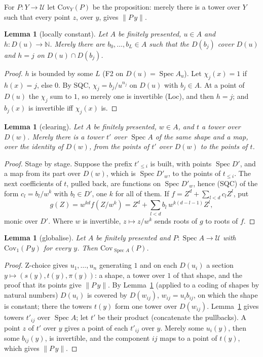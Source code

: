 \documentclass[11pt]{amsart}
\newtheorem{lemma}[theorem]{Lemma}
\theoremstyle{definition}
\theoremstyle{remark}
\newcommand{\Spec}{\operatorname{Spec}}
\newcommand{\tr}[1]{\|#1\|}
\newcommand{\N}{\mathbb N}
\newcommand{\U}{\mathcal U}
\begin{document}
For $P:Y\to\U$ let $\mathrm{Cov}_Y(P)$ be the proposition: merely there is
a tower over $Y$ such that every point $z$, over $y$, gives $\tr{P\,y}$.

\begin{lemma}[locally constant]\label{l:lc}
Let $A$ be finitely presented, $u\in A$ and $h:D(u)\to\N$. Merely there are
$b_0,\dots,b_L\in A$ such that the $D(b_j)$ cover $D(u)$ and $h=j$ on
$D(u)\cap D(b_j)$.
\end{lemma}
\begin{proof}
$h$ is bounded by some $L$ (F2 on $D(u)=\Spec A_u$). Let
$\chi_j(x)=1$ if $h(x)=j$, else $0$. By SQC, $\chi_j=b_j/u^{n_j}$ on
$D(u)$ with $b_j\in A$. At a point of $D(u)$ the $\chi_j$ sum to $1$, so
merely one is invertible (Loc), and then $h=j$; and $b_j(x)$ is
invertible iff $\chi_j(x)$ is.
\end{proof}

\begin{lemma}[clearing]\label{l:clear}
Let $A$ be finitely presented, $w\in A$, and $t$ a tower over $D(w)$.
Merely there is a tower $t'$ over $\Spec A$ of the same shape and a map,
over the identity of $D(w)$, from the points of $t'$ over $D(w)$ to the
points of $t$.
\end{lemma}
\begin{proof}
Stage by stage. Suppose the prefix $t'_{\le i}$ is built, with points
$\Spec D'$, and a map from its part over $D(w)$, which is $\Spec D'_w$, to
the points of $t_{\le i}$. The next coefficients of $t$, pulled back, are
functions on $\Spec D'_w$, hence (SQC) of the form $c_l=b_l/w^k$ with
$b_l\in D'$, one $k$ for all of them. If $f=Z^d+\sum_{l<d}c_lZ^l$, put
\[g(Z)=w^{kd}f(Z/w^k)=Z^d+\sum_{l<d}b_l\,w^{k(d-l-1)}Z^l,\]
monic over $D'$. Where $w$ is invertible, $z\mapsto z/w^k$ sends roots of
$g$ to roots of $f$.
\end{proof}

\begin{lemma}[globalise]\label{l:glob}
Let $A$ be finitely presented and $P:\Spec A\to\U$ with
$\mathrm{Cov}_1(P\,y)$ for every $y$. Then $\mathrm{Cov}_{\Spec A}(P)$.
\end{lemma}
\begin{proof}
Z-choice gives $u_1,\dots,u_n$ generating $1$ and on each $D(u_i)$ a
section $y\mapsto(s(y),t(y),\pi(y))$: a shape, a tower over $1$ of that
shape, and the proof that its points give $\tr{P\,y}$. By
Lemma~\ref{l:lc} (applied to a coding of shapes by natural numbers) $D(u_i)$
is covered by $D(w_{ij})$, $w_{ij}=u_ib_{ij}$, on which the shape is
constant; there the towers $t(y)$ form one tower over $D(w_{ij})$.
Lemma~\ref{l:clear} gives towers $t'_{ij}$ over $\Spec A$; let $t'$ be
their product (concatenate the pullbacks). A point $z$ of $t'$ over $y$
gives a point of each $t'_{ij}$ over $y$. Merely some $u_i(y)$, then some
$b_{ij}(y)$, is invertible, and the component $ij$ maps to a point of
$t(y)$, which gives $\tr{P\,y}$.
\end{proof}
\end{document}

